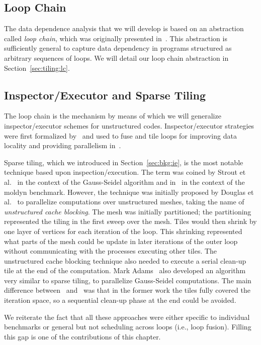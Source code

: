 \subsection*{Loop Chain}
The data dependence analysis that we will develop is based on an abstraction called \textit{loop chain}, which was originally presented in~\cite{KriegerHIPS2013}. This abstraction is sufficiently general to capture data dependency in programs structured as arbitrary sequences of loops. We will detail our loop chain abstraction in Section~\ref{sec:tiling:lc}.

\subsection*{Inspector/Executor and Sparse Tiling}
The loop chain is the mechanism by means of which we will generalize inspector/executor schemes for unstructured codes. Inspector/executor strategies were first formalized by~\cite{Saltz91} and used to fuse and tile loops for improving data locality and providing parallelism in~\cite{dimeEtna00,StroutLCPC2002,Demmel08,KriegerIAAA2012}. 

Sparse tiling, which we introduced in Section~\ref{sec:bkg:ie}, is the most notable technique based upon inspection/execution. The term was coined by Strout et al.~\cite{StroutLCPC2002,StroutIJHPCA} in the context of the Gauss-Seidel algorithm and in~\cite{StroutPLDI03} in the context of the moldyn benchmark. However, the technique was initially proposed by Douglas et al.~\cite{dimeEtna00} to parallelize computations over unstructured meshes, taking the name of \textit{unstructured cache blocking}. The mesh was initially partitioned; the partitioning represented the tiling in the first sweep over the mesh. Tiles would then shrink by one layer of vertices for each iteration of the loop. This shrinking represented what parts of the mesh could be update in later iterations of the outer loop without communicating with the processes executing other tiles. The unstructured cache blocking technique also needed to execute a serial clean-up tile at the end of the computation. Mark Adams~\cite{Adams99c} also developed an algorithm very similar to sparse tiling, to parallelize Gauss-Seidel computations. The main difference between~\cite{StroutLCPC2002,StroutIJHPCA} and~\cite{dimeEtna00} was that in the former work the tiles fully covered the iteration space, so a sequential clean-up phase at the end could be avoided. 

We reiterate the fact that all these approaches were either specific to individual benchmarks or general but not scheduling across loops (i.e., loop fusion). Filling this gap is one of the contributions of this chapter.

